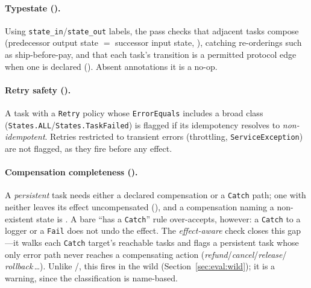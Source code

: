 \paragraph{Typestate ().}
Using \texttt{state\_in}/\texttt{state\_out} labels, the pass checks that adjacent tasks
compose (predecessor output state $=$ successor input state, ), catching
re-orderings such as ship-before-pay, and that each task's transition is a permitted
protocol edge when one is declared (). Absent annotations it is a no-op.

\paragraph{Retry safety ().}
A task with a \texttt{Retry} policy whose \texttt{ErrorEquals} includes a broad class
(\texttt{States.ALL}/\texttt{States.TaskFailed}) is flagged  if its
idempotency resolves to \emph{non-idempotent}. Retries restricted to transient errors
(throttling, \texttt{ServiceException}) are not flagged, as they fire before any effect.

\paragraph{Compensation completeness ().}
A \emph{persistent} task needs either a declared compensation or a \texttt{Catch} path;
one with neither leaves its effect uncompensated (), and a compensation
naming a non-existent state is . A bare ``has a \texttt{Catch}'' rule
over-accepts, however: a \texttt{Catch} to a logger or a \texttt{Fail} does not undo the
effect. The \emph{effect-aware} check  closes this gap---it walks each
\texttt{Catch} target's reachable tasks and flags a persistent task whose only error path
never reaches a compensating action (\emph{refund}/\emph{cancel}/\emph{release}/%
\emph{rollback}\,\dots). Unlike /, this fires in the wild
(Section~\ref{sec:eval:wild}); it is a warning, since the classification is name-based.


